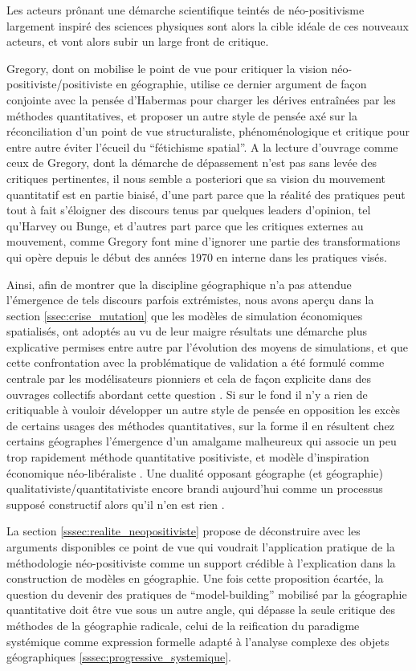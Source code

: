 Les acteurs prônant une démarche scientifique teintés de néo-positivisme largement inspiré des sciences physiques sont alors la cible idéale de ces nouveaux acteurs, et vont alors subir un large front de critique. 

Gregory, dont on mobilise le point de vue pour critiquer la vision néo-positiviste/positiviste en géographie, utilise ce dernier argument de façon conjointe avec la pensée d'Habermas pour charger les dérives entraînées par les méthodes quantitatives, et proposer un autre style de pensée axé sur la réconciliation d'un point de vue structuraliste, phénoménologique et critique pour entre autre éviter l'écueil du \enquote{fétichisme spatial}. A la lecture d'ouvrage comme ceux de Gregory, dont la démarche de dépassement n'est pas sans levée des critiques pertinentes, il nous semble a posteriori que sa vision du mouvement quantitatif est en partie biaisé, d'une part parce que la réalité des pratiques peut tout à fait s'éloigner des discours tenus par quelques leaders d'opinion, tel qu'Harvey ou Bunge, et d'autres part parce que les critiques externes au mouvement, comme Gregory font mine d'ignorer une partie des transformations qui opère depuis le début des années 1970 en interne dans les pratiques visés. 

Ainsi, afin de montrer que la discipline géographique n'a pas attendue l'émergence de tels discours parfois extrémistes, nous avons aperçu dans la section \ref{ssec:crise_mutation} que les modèles de simulation économiques spatialisés, ont adoptés au vu de leur maigre résultats une démarche plus explicative permises entre autre par l'évolution des moyens de simulations, et que cette confrontation avec la problématique de validation a été formulé comme centrale par les modélisateurs pionniers et cela de façon explicite dans des ouvrages collectifs abordant cette question \autocite{Marble1972}. Si sur le fond il n'y a rien de critiquable à vouloir développer un autre style de pensée en opposition les excès de certains usages des méthodes quantitatives, sur la forme il en résultent chez certains géographes l'émergence d'un amalgame malheureux qui associe un peu trop rapidement méthode quantitative positiviste, et modèle d'inspiration économique néo-libéraliste \autocite[61-64]{Paterson1984}. Une dualité opposant géographe (et géographie) qualitativiste/quantitativiste encore brandi aujourd'hui comme un processus supposé constructif alors qu'il n'en est rien \autocite{Sheppard2001}.

La section \ref{sssec:realite_neopositiviste} propose de déconstruire avec les arguments disponibles ce point de vue qui voudrait l'application pratique de la méthodologie néo-positiviste comme un support crédible à l'explication dans la construction de modèles en géographie. Une fois cette proposition écartée, la question du devenir des pratiques de \foreignquote{english}{model-building} mobilisé par la géographie quantitative doit être vue sous un autre angle, qui dépasse la seule critique des méthodes de la géographie radicale, celui de la reification du paradigme systémique comme expression formelle adapté à l'analyse complexe des objets géographiques \ref{sssec:progressive_systemique}.

